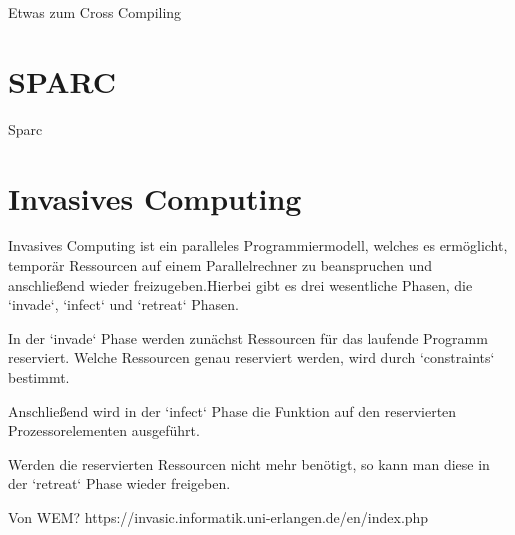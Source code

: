 Etwas zum Cross Compiling



\section{SPARC}

Sparc

\section{Invasives Computing}

Invasives Computing ist ein paralleles Programmiermodell, welches es ermöglicht, temporär Ressourcen auf einem Parallelrechner
zu beanspruchen und anschließend wieder freizugeben.Hierbei gibt es drei wesentliche Phasen, die `invade`, `infect` und `retreat` Phasen. 

In der `invade` Phase werden zunächst Ressourcen für das laufende Programm reserviert. Welche Ressourcen genau reserviert werden,
wird durch `constraints` bestimmt.

Anschließend wird in der `infect` Phase die Funktion auf den reservierten Prozessorelementen ausgeführt.

Werden die reservierten Ressourcen nicht mehr benötigt, so kann man diese in der `retreat` Phase wieder freigeben.

Von WEM? https://invasic.informatik.uni-erlangen.de/en/index.php
